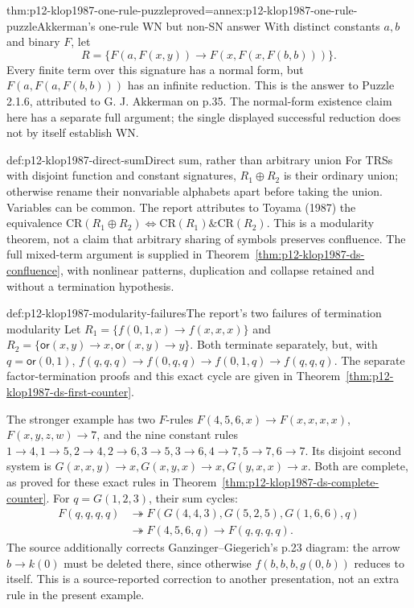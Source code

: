\begin{hbtheorem}{thm:p12-klop1987-one-rule-puzzle}{proved=annex:p12-klop1987-one-rule-puzzle}{Akkerman's one-rule WN but non-SN answer}
With distinct constants \(a,b\) and binary \(F\), let
\[
 R=\{F(a,F(x,y))\to F(x,F(x,F(b,b)))\}.
\]
Every finite term over this signature has a normal form, but
\(F(a,F(a,F(b,b)))\) has an infinite reduction.
This is the answer to Puzzle 2.1.6, attributed to G. J. Akkerman on p.35.
The normal-form existence claim here has a separate full argument; the
single displayed successful reduction does not by itself establish WN.
\end{hbtheorem}

\begin{hbdefinition}{def:p12-klop1987-direct-sum}{Direct sum, rather than arbitrary union}
For TRSs with disjoint function and constant signatures, \(R_1\oplus R_2\)
is their ordinary union; otherwise rename their nonvariable alphabets
apart before taking the union. Variables can be common.
The report attributes to Toyama (1987) the equivalence
\(\mathrm{CR}(R_1\oplus R_2)\Longleftrightarrow
\mathrm{CR}(R_1)\mathbin{\&}\mathrm{CR}(R_2)\).
This is a modularity theorem, not a claim that arbitrary sharing of symbols
preserves confluence.
The full mixed-term argument is supplied in
Theorem~\ref{thm:p12-klop1987-ds-confluence}, with nonlinear patterns,
duplication and collapse retained and without a termination hypothesis.
\end{hbdefinition}

\begin{hbexample}{def:p12-klop1987-modularity-failures}{The report's two failures of termination modularity}
Let \(R_1=\{f(0,1,x)\to f(x,x,x)\}\) and
\(R_2=\{\mathsf{or}(x,y)\to x,\mathsf{or}(x,y)\to y\}\).
Both terminate separately, but, with \(q=\mathsf{or}(0,1)\),
\(f(q,q,q)\to f(0,q,q)\to f(0,1,q)\to f(q,q,q)\).
The separate factor-termination proofs and this exact cycle are given in
Theorem~\ref{thm:p12-klop1987-ds-first-counter}.

The stronger example has two \(F\)-rules
\(F(4,5,6,x)\to F(x,x,x,x)\), \(F(x,y,z,w)\to7\), and
the nine constant rules
\(1\to4,1\to5,2\to4,2\to6,3\to5,3\to6,4\to7,5\to7,6\to7\).
Its disjoint second system is
\(G(x,x,y)\to x,G(x,y,x)\to x,G(y,x,x)\to x\).
Both are complete, as proved for these exact rules in
Theorem~\ref{thm:p12-klop1987-ds-complete-counter}. For
\(q=G(1,2,3)\), their sum cycles:
\begin{align*}
 F(q,q,q,q)&\twoheadrightarrow
 F(G(4,4,3),G(5,2,5),G(1,6,6),q)\\
 &\twoheadrightarrow F(4,5,6,q)\to F(q,q,q,q).
\end{align*}
The source additionally corrects Ganzinger--Giegerich's p.23 diagram:
the arrow \(b\to k(0)\) must be deleted there, since otherwise
\(f(b,b,b,g(0,b))\) reduces to itself. This is a source-reported
correction to another presentation, not an extra rule in the present example.
\end{hbexample}

